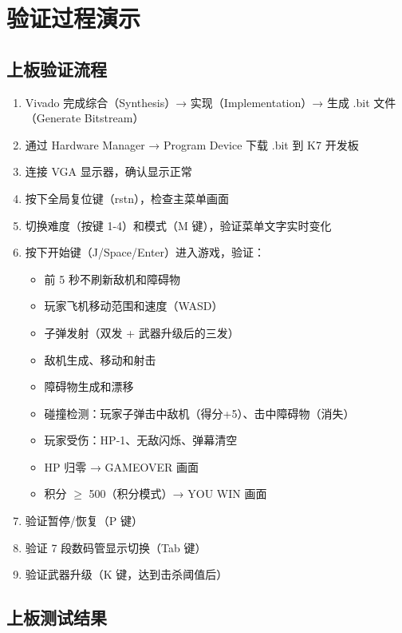 \documentclass[12pt,a4paper]{ctexart}
\begin{document}
\section{验证过程演示}

\subsection{上板验证流程}

\begin{enumerate}[label=(\arabic*)]
    \item Vivado 完成综合（Synthesis）→ 实现（Implementation）→ 生成 .bit 文件（Generate Bitstream）
    \item 通过 Hardware Manager → Program Device 下载 .bit 到 K7 开发板
    \item 连接 VGA 显示器，确认显示正常
    \item 按下全局复位键（rstn），检查主菜单画面
    \item 切换难度（按键 1-4）和模式（M 键），验证菜单文字实时变化
    \item 按下开始键（J/Space/Enter）进入游戏，验证：
    \begin{itemize}
        \item 前 5 秒不刷新敌机和障碍物
        \item 玩家飞机移动范围和速度（WASD）
        \item 子弹发射（双发 + 武器升级后的三发）
        \item 敌机生成、移动和射击
        \item 障碍物生成和漂移
        \item 碰撞检测：玩家子弹击中敌机（得分+5）、击中障碍物（消失）
        \item 玩家受伤：HP-1、无敌闪烁、弹幕清空
        \item HP 归零 → GAMEOVER 画面
        \item 积分 $\ge$ 500（积分模式）→ YOU WIN 画面
    \end{itemize}
    \item 验证暂停/恢复（P 键）
    \item 验证 7 段数码管显示切换（Tab 键）
    \item 验证武器升级（K 键，达到击杀阈值后）
\end{enumerate}

\subsection{上板测试结果}
\end{document}
